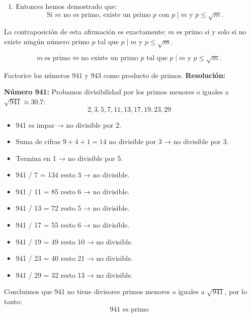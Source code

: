\documentclass[a4paper,12pt]{article}
\begin{document}
\begin{ejercicio}[title=Ejercicio 16]
\begin{enumerate}
\item Entonces hemos demostrado que:
\[
\text{Si } m \text{ no es primo, existe un primo } p \text{ con } p\mid m \text{ y } p\le\sqrt{m}.
\]
\end{enumerate}

La contraposición de esta afirmación es exactamente: $m$ es primo si y solo si no existe ningún número primo $p$ tal que $p\mid m$ y $p\le \sqrt{m}$.

\[
\boxed{\,m\ \text{es primo} \iff \text{no existe un primo } p \text{ tal que } p\mid m \text{ y } p\le\sqrt{m}.\,}
\]

\end{ejercicio}

\begin{ejercicio}[title=Ejercicio 17]
Factorice los números $941$ y $943$ como producto de primos.
\tcblower
\textbf{Resolución:}

\vspace{0.5em}
    \textbf{Número 941:}
        Probamos divisibilidad por los primos menores o iguales a $\sqrt{941} \approx 30.7$:
        \[
        2,3,5,7,11,13,17,19,23,29
        \]
        \begin{itemize}
            \item 941 es impar → no divisible por 2.
            \item Suma de cifras $9+4+1=14$ no divisible por 3 → no divisible por 3.
            \item Termina en 1 → no divisible por 5.
            \item 941 / 7 = 134 resto 3 → no divisible.
            \item 941 / 11 = 85 resto 6 → no divisible.
            \item 941 / 13 = 72 resto 5 → no divisible.
            \item 941 / 17 = 55 resto 6 → no divisible.
            \item 941 / 19 = 49 resto 10 → no divisible.
            \item 941 / 23 = 40 resto 21 → no divisible.
            \item 941 / 29 = 32 resto 13 → no divisible.
        \end{itemize}
        Concluimos que 941 no tiene divisores primos menores o iguales a $\sqrt{941}$, por lo tanto:
        \[
        \boxed{941 \text{ es primo}}
        \]
    
\end{ejercicio}
\end{document}
